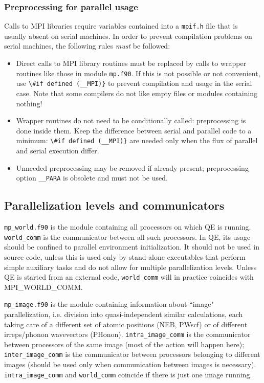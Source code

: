 \documentclass[12pt,a4paper]{article}
\begin{document}
\subsubsection{Preprocessing for parallel usage}

Calls to MPI libraries require variables contained into a
\texttt{mpif.h} file that is usually absent on serial machines.
In order to prevent compilation problems on serial machines,
the following rules {\em must} be followed:
\begin{itemize}
\item Direct calls to MPI library routines must be replaced by
calls to wrapper routines like those in module \texttt{mp.f90}.
If this is not possible or not convenient, use \verb|\#if defined (__MPI)}|
to prevent compilation and usage in the serial case. Note that
some compilers do not like empty files or modules containing nothing!
\item Wrapper routines do not need to be conditionally called:
preprocessing is done inside them. Keep the difference between serial
and parallel code to a minimum: \verb|\#if defined (__MPI)}| are needed
only when the flux of parallel and serial execution differ.
\item Unneeded preprocessing may be removed if already present;
preprocessing option \verb|__PARA| is obsolete and must not be used.
\end{itemize}

\subsection{Parallelization levels and communicators}

\texttt{mp\_world.f90} is the module containing all processors
on which QE is running. \texttt{world\_comm}
is the communicator between all such processors. In QE, its usage
should be confined to parallel environment initialization. It
should not be used in source code, unless this is used only by
stand-alone executables that perform simple auxiliary tasks
and do not allow for  multiple parallelization levels.
Unless QE is started from an external code, \texttt{world\_comm}
will in practice coincides with MPI\_WORLD\_COMM.

\texttt{mp\_image.f90} is the module containing information about
``image" parallelization, i.e. division into quasi-independent similar
calculations, each taking care of a different set of atomic
positions (NEB, PWscf) or of different irreps/phonon wavevectors
(PHonon). \texttt{intra\_image\_comm} is the communicator between
processors of the same image (most of the action will happen here);
\texttt{inter\_image\_comm} is the communicator between processors
belonging to different images (should be used only when communication
between images is necessary).
{\tt intra\_image\_comm} and {\tt world\_comm} coincide if there
is just one image running.
\end{document}
